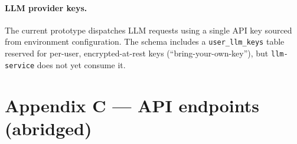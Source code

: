 \documentclass[a4paper,12pt]{article}
\begin{document}
\paragraph{LLM provider keys.} The current prototype dispatches LLM requests using a single API key sourced from environment configuration. The schema includes a \verb|user_llm_keys| table reserved for per-user, encrypted-at-rest keys (``bring-your-own-key''), but \verb|llm-service| does not yet consume it.

\newpage

\section*{Appendix C --- API endpoints (abridged)}

\end{document}
